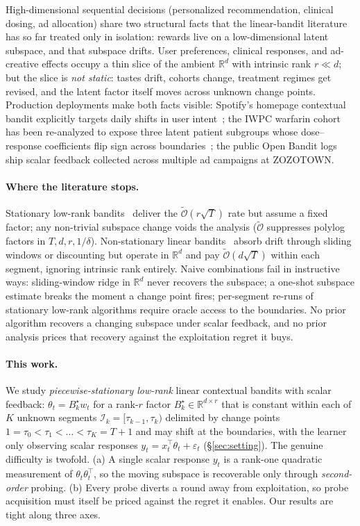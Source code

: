 \documentclass{article}
\newcommand{\R}{\mathbb{R}}
\newcommand{\cI}{\mathcal{I}}
\newcommand{\tilO}{\widetilde{\mathcal{O}}}
\begin{document}
High-dimensional sequential decisions (personalized recommendation,
clinical dosing, ad allocation) share two structural facts that the
linear-bandit literature has so far treated only in isolation: rewards
live on a low-dimensional latent subspace, and that subspace drifts.
User preferences, clinical responses, and ad-creative effects occupy
a thin slice of the ambient $\R^d$ with intrinsic rank $r\ll d$; but
the slice is \emph{not static}: tastes drift, cohorts change,
treatment regimes get revised, and the latent factor itself moves
across unknown change points. Production deployments make both
facts visible: Spotify's homepage contextual bandit explicitly
targets daily shifts in user
intent~\citep{feijer2025calibrated}; the IWPC warfarin
cohort~\citep{international2009estimation} has been re-analyzed to
expose three latent patient subgroups whose dose--response
coefficients flip sign across boundaries~\citep{liu2025change}; the
public Open Bandit logs~\citep{saito2020open} ship scalar feedback
collected across multiple ad campaigns at ZOZOTOWN.

\paragraph{Where the literature stops.}
Stationary low-rank
bandits~\citep{jun2019bilinear,jedra2024low,jang2024efficient}
deliver the $\tilO(r\sqrt T)$ rate but assume a fixed factor; any
non-trivial subspace change voids the analysis ($\tilO$ suppresses
polylog factors in $T,d,r,1/\delta$). Non-stationary linear
bandits~\citep{russac2019weighted,cheung2019learning} absorb drift
through sliding windows or discounting but operate in $\R^d$ and pay
$\tilO(d\sqrt T)$ within each segment, ignoring intrinsic rank
entirely. Naive combinations fail in instructive ways: sliding-window
ridge in $\R^d$ never recovers the subspace; a one-shot subspace
estimate breaks the moment a change point fires; per-segment re-runs
of stationary low-rank algorithms require oracle access to the
boundaries. No prior algorithm recovers a changing subspace under
scalar feedback, and no prior analysis prices that recovery against
the exploitation regret it buys.

\paragraph{This work.}
We study \emph{piecewise-stationary low-rank} linear contextual
bandits with scalar feedback: $\theta_t = B_k^\star w_t$ for a
rank-$r$ factor $B_k^\star\in\R^{d\times r}$ that is constant within
each of $K$ unknown segments
$\cI_k=[\tau_{k-1},\tau_k)$ delimited by change points
$1=\tau_0<\tau_1<\dots<\tau_K=T{+}1$ and may shift at the boundaries,
with the learner only observing scalar responses
$y_t=x_t^\top\theta_t+\varepsilon_t$ (\S\ref{sec:setting}). The
genuine difficulty is twofold. (a) A single scalar response $y_t$ is
a rank-one quadratic measurement of $\theta_t\theta_t^\top$, so the
moving subspace is recoverable only through \emph{second-order}
probing. (b) Every probe diverts a round away from exploitation, so
probe acquisition must itself be priced against the regret it
enables. Our results are tight along three axes.
\end{document}
